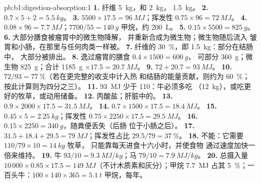 \begin{solution}{pb:b1:digestion-absorption:1}
\textbf{1.} 纤维 \qty{5}{kg}，和 \qty{2}{kg}，
\qty{1.5}{kg}。
\textbf{2.} $0.7\times 5 + 2 = \qty{5.5}{kg}$。
\textbf{3.} $5500\times 17.5 = \qty{96}{MJ}$；挥发性 $0.75\times 96 =
\qty{72}{MJ}$。
\textbf{4.} $0.08\times 96 = \qty{7.7}{MJ}$；$7700/55 = \qty{140}{g}$
甲烷，约 \qty{200}{L}。
\textbf{5.} $0.15\times 5500 = \qty{825}{g}$。
\textbf{6.} 大部分膳食被瘤胃中的微生物降解，
并重新合成为微生物；微生物随后流入
皱胃和小肠，在那里与任何肉类一样被。
\textbf{7.} 纤维的 \qty{30}{\%}，即 \qty{1.5}{kg}：部分在结肠中，
大部分被排出。
\textbf{8.} 逸过瘤胃的膳食 $0.4\times 1500 = \qty{600}{g}$，
可部分 \qty{360}{g}；微生物 \qty{825}{g}；合计 \qty{1185}{g}
$\times 17.5 = \qty{20.7}{MJ}$。
\textbf{9.} $72 + 20.7 = \qty{93}{MJ}$。
\textbf{10.} $72/93 = \qty{77}{\%}$（若在更完整的收支中计入热
和结肠的能量贡献，则约为 \qty{60}{\%}；
按此计算则为四分之三）。
\textbf{11.} \qty{93}{MJ} 少于 \qty{110}{}：牛必须多吃
（\qty{12}{kg}），或吃更好的牧草，或动用储备。
\textbf{12.} 丙酸盐；肝脏中的。
\textbf{13.} $0.9\times 2000\times 17.5 = \qty{31.5}{MJ}$。
\textbf{14.} $0.7\times 1500\times 17.5 = \qty{18.4}{MJ}$。
\textbf{15.} $0.45\times 5 = \qty{2.25}{kg}$；挥发性 $0.75\times 2250\times
17.5 = \qty{29.5}{MJ}$。
\textbf{16.} $0.15\times 2250 = \qty{340}{g}$，随粪便丢失（后肠
位于小肠之后）。
\textbf{17.} $31.5 + 18.4 + 29.5 = \qty{79}{MJ}$；挥发性占比 $29.5/79 =
\qty{37}{\%}$。
\textbf{18.} 不能：它需要 $110/79\times 10 = \qty{14}{kg}$ 牧草，
只能靠每天进食十六小时，并使食物
通过速度加快一倍来维持。
\textbf{19.} 牛 $93/10 = \qty{9.3}{MJ/kg}$；马 $79/10 =
\qty{7.9}{MJ/kg}$。
\textbf{20.} 总摄入量 $10\,000\times 0.85\times 17.5 =
\qty{149}{MJ}$（不计木质素和灰分）；甲烷 \qty{7.7}{MJ} 占其
\qty{5}{\%}；一百头牛：$100\times 140\times 365 =
\qty{5.1}{t}$ 甲烷，每年。

\end{solution}
